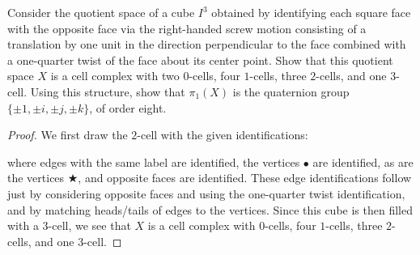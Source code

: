 \documentclass[12pt]{article}
\theoremstyle{remark}
\begin{document}
\setcounter{subsubsection}{13}
\begin{problem}
  Consider the quotient space of a cube $I^3$ obtained by identifying each square face with the opposite face via the right-handed screw motion consisting of a translation by one unit in the direction perpendicular to the face combined with a one-quarter twist of the face about its center point. Show that this quotient space $X$ is a cell complex with two $0$-cells, four $1$-cells, three $2$-cells, and one $3$-cell. Using this structure, show that $\pi_1(X)$ is the quaternion group $\{\pm1,\pm i,\pm j,\pm k\}$, of order eight.
\end{problem}
\begin{proof}
  We first draw the $2$-cell with the given identifications:
  \begin{center}
  \end{center}
  where edges with the same label are identified, the vertices $\bullet$ are identified, as are the vertices $\bigstar$, and opposite faces are identified. These edge identifications follow just by considering opposite faces and using the one-quarter twist identification, and by matching heads/tails of edges to the vertices. Since this cube is then filled with a 3-cell, we see that $X$ is a cell complex with $0$-cells, four $1$-cells, three $2$-cells, and one $3$-cell.

\end{proof}
\end{document}
